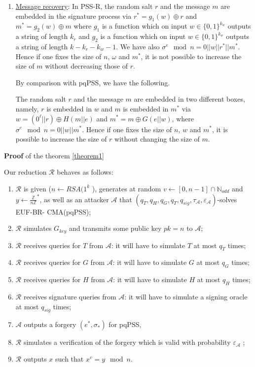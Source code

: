 \documentclass[a4paper,11pt]{article}
\begin{document}
\begin{enumerate}
\item \underline{Message recovery}: In PSS-R, the random salt $r$ and the message $m$ are embedded in the signature process via $r^*=g_1(w)\oplus r$ and $m^*=g_2(w)\oplus m$ where $g_1 $ is a function which on input $w\in\{0,1\}^{k_w}$ outputs a string of length $k_r$ and $g_2$ is a function which on input $w\in\{0,1\}^{k_w}$ outputs a string of length $k-k_r-k_w-1$. We have also $\sigma^e\mod n=0||w||r^*||m^*$. Hence if one fixes the size of $n$, $\omega$ and $m^*$, it is not possible to increase the size of $m$ without decreasing those of $r$.

By comparison with pqPSS, we have the following.

The random salt $r$ and the message $m$ are embedded in two different boxes, namely, $r$ is embedded in $w$ and $m$ is embedded in $m^*$ via $w=(0^{\ell}||r)\oplus H(m||e)$  and $m^*=m\oplus G(e||w)$, where $\sigma^{e}\mod n=0||w||m^*$. Hence if one fixes the size of $n$, $w$ and $m^*$, it is  possible to increase the size of $r$ without changing the size of $m$.%

\end{enumerate}


\textbf{Proof }  of the theorem \ref{theorem1}

Our reduction $\mathcal{R}$ behaves as follows:
 \begin{enumerate}
  \item  $\mathcal{R}$ is given ($n \leftarrow RSA(1^{k}$ ), generates at random $v \leftarrow [0, n-1]\cap \mathbb{N}_{odd}$  and $y
      \leftarrow \frac{\mathbb{Z}}{n\mathbb{Z}}^{*}$, as well as an attacker $\mathcal{A}$ that    $(q_{T}, q_{H}, q_{G}, q_{T}, q_{sig},
      \tau_{\mathcal{A}}, \varepsilon_{\mathcal{A}} )$-solves  EUF-BR- CMA(pqPSS);
 \item    $\mathcal{R}$ simulates $G_{key}$ and transmits some public key $pk=n$ to  $\mathcal{A}$;
\item     $\mathcal{R}$ receives queries for $T$ from  $\mathcal{A}$: it will have to simulate $T$ at most $q_{T}$ times;
\item     $\mathcal{R}$ receives queries for $G$ from  $\mathcal{A}$: it will have to simulate $G$ at most $q_{G}$ times;
\item     $\mathcal{R}$ receives queries for $H$ from  $\mathcal{A}$: it will have to simulate $H$ at most $q_{H}$ times;
\item     $\mathcal{R}$ receives signature queries from  $\mathcal{A}$: it will have to simulate a signing oracle at most $q_{sig}$ times;
\item     $\mathcal{A}$ outputs a forgery $(e^{*}, \sigma_{*})$ for pqPSS,
 \item    $\mathcal{R}$ simulates a verification of the forgery which is valid with probability $\varepsilon_{\mathcal{A}}$ ;
 \item    $\mathcal{R}$ outputs $x$ such that $x^{v} = y \mod n$.
\end{enumerate}
\end{document}
